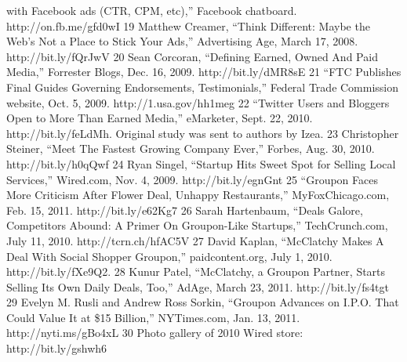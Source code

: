 with Facebook ads (CTR, CPM, etc),'' Facebook chatboard. http://on.fb.me/gfd0wI
19 Matthew Creamer, ``Think Different: Maybe the Web’s Not a Place to Stick Your Ads,''
Advertising Age, March 17, 2008. http://bit.ly/fQrJwV
20 Sean Corcoran, ``Defining Earned, Owned And Paid Media,'' Forrester Blogs, Dec. 16, 2009.
http://bit.ly/dMR8sE
21 ``FTC Publishes Final Guides Governing Endorsements, Testimonials,'' Federal Trade
Commission website, Oct. 5, 2009. http://1.usa.gov/hh1meg
22 ``Twitter Users and Bloggers Open to More Than Earned Media,'' eMarketer, Sept. 22, 2010.
http://bit.ly/feLdMh. Original study was sent to authors by Izea.
23 Christopher Steiner, ``Meet The Fastest Growing Company Ever,'' Forbes, Aug. 30, 2010.
http://bit.ly/h0qQwf
24 Ryan Singel, ``Startup Hits Sweet Spot for Selling Local Services,'' Wired.com, Nov. 4, 2009.
http://bit.ly/egnGnt
25 ``Groupon Faces More Criticism After Flower Deal, Unhappy Restaurants,''
MyFoxChicago.com, Feb. 15, 2011. http://bit.ly/e62Kg7
26 Sarah Hartenbaum, ``Deals Galore, Competitors Abound: A Primer On Groupon-Like
Startups,'' TechCrunch.com, July 11, 2010. http://tcrn.ch/hfAC5V
27 David Kaplan, ``McClatchy Makes A Deal With Social Shopper Groupon,'' paidcontent.org,
July 1, 2010. http://bit.ly/fXe9Q2.
28 Kunur Patel, ``McClatchy, a Groupon Partner, Starts Selling Its Own Daily Deals, Too,'' AdAge,
March 23, 2011. http://bit.ly/fs4tgt
29 Evelyn M. Rusli and Andrew Ross Sorkin, ``Groupon Advances on I.P.O. That Could Value
It at \$15 Billion,'' NYTimes.com, Jan. 13, 2011. http://nyti.ms/gBo4xL
30 Photo gallery of 2010 Wired store: http://bit.ly/gshwh6


